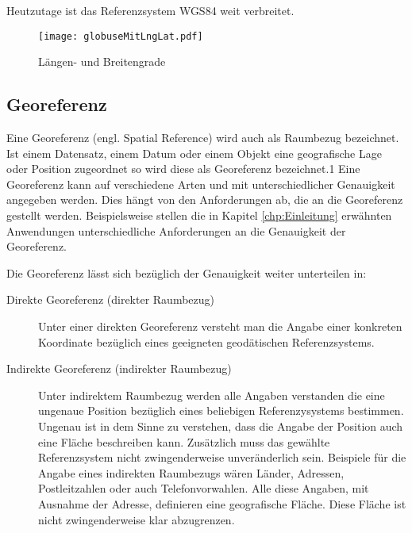 			Heutzutage ist das Referenzsystem WGS84 weit verbreitet.

			\begin{figure}[h!]
			\begin{center}
				\texttt{[image: globuseMitLngLat.pdf]}
				\caption{Längen- und Breitengrade}
				\label{img:lnglat}
			\end{center}
			\end{figure}	

		\subsection{Georeferenz} 
			
			Eine Georeferenz (engl. Spatial Reference) wird auch als Raumbezug bezeichnet. 
			Ist einem Datensatz, einem Datum oder einem Objekt eine geografische Lage oder Position zugeordnet so wird diese als Georeferenz bezeichnet.1 
			Eine Georeferenz kann auf verschiedene Arten und mit unterschiedlicher Genauigkeit angegeben werden.
			Dies hängt von den Anforderungen ab, die an die Georeferenz gestellt werden. 
			Beispielsweise stellen die in Kapitel \ref{chp:Einleitung} erwähnten Anwendungen unterschiedliche Anforderungen an die Genauigkeit der Georeferenz.  
			
			Die Georeferenz lässt sich bezüglich der Genauigkeit weiter unterteilen in: 
		
			\begin{description}

	 			\item[Direkte Georeferenz (direkter Raumbezug)] 
	 				
	 				Unter einer direkten Georeferenz versteht man die Angabe einer konkreten Koordinate bezüglich eines geeigneten geodätischen Referenzsystems.  

	 			\item[Indirekte Georeferenz (indirekter Raumbezug) ] 
	 				
	 				Unter indirektem Raumbezug werden alle Angaben verstanden die eine ungenaue Position bezüglich eines beliebigen Referenzysystems bestimmen.
		 			Ungenau ist in dem Sinne zu verstehen, dass die Angabe der Position auch eine Fläche beschreiben kann.
		 			Zusätzlich muss das gewählte Referenzsystem nicht zwingenderweise unveränderlich sein.   
		 			Beispiele für die Angabe eines indirekten Raumbezugs wären Länder, Adressen, Postleitzahlen oder auch Telefonvorwahlen. 
		 			Alle diese Angaben, mit Ausnahme der Adresse, definieren eine geografische Fläche. 
		 			Diese Fläche ist nicht zwingenderweise klar abzugrenzen.  

			\end{description}

